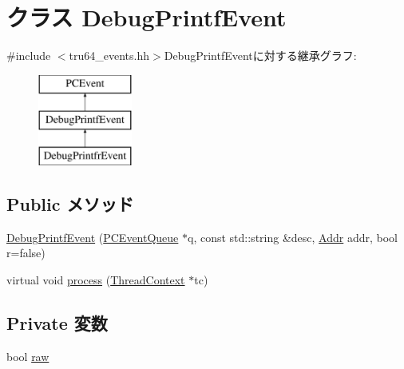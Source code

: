 \hypertarget{classDebugPrintfEvent}{
\section{クラス DebugPrintfEvent}
\label{classDebugPrintfEvent}
}


{\ttfamily \#include $<$tru64\_\-events.hh$>$}DebugPrintfEventに対する継承グラフ:\begin{figure}[H]
\begin{center}
\leavevmode
\includegraphics[height=3cm]{classDebugPrintfEvent}
\end{center}
\end{figure}
\subsection*{Public メソッド}
\begin{DoxyCompactItemize}
\item 
\hyperlink{classDebugPrintfEvent_aa5a5cb2101117463899ff7d14a256455}{DebugPrintfEvent} (\hyperlink{classPCEventQueue}{PCEventQueue} $\ast$q, const std::string \&desc, \hyperlink{base_2types_8hh_af1bb03d6a4ee096394a6749f0a169232}{Addr} addr, bool r=false)
\item 
virtual void \hyperlink{classDebugPrintfEvent_ad66a9d5ec7cfe597b848a17c0df5cc28}{process} (\hyperlink{classThreadContext}{ThreadContext} $\ast$tc)
\end{DoxyCompactItemize}
\subsection*{Private 変数}
\begin{DoxyCompactItemize}
\item 
bool \hyperlink{classDebugPrintfEvent_a388d89b22cf20a999da0c692a3c3eb77}{raw}
\end{DoxyCompactItemize}


